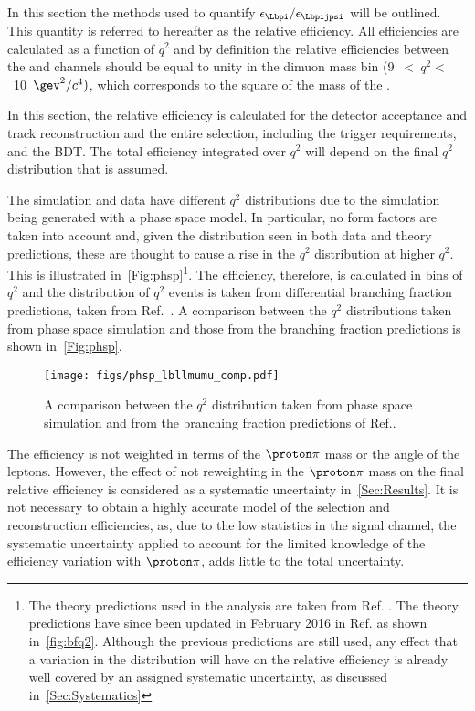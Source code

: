 In this section the methods used to quantify $\epsilon_{\Lbpi}/\epsilon_{\Lbpijpsi}$ will be outlined. This quantity is referred to hereafter as the relative efficiency. All efficiencies are calculated as a function of $q^{2}$ and by definition the relative efficiencies between the \Lbpi and \Lbpijpsi channels should be equal to unity in the dimuon mass bin (9~$<~q^{2}<$~10~$\gev^{2}/c^{4})$, which corresponds to the square of the  mass of the \jpsi.

In this section, the relative efficiency is calculated for the detector acceptance and track reconstruction and the entire selection, including the trigger requirements, and the BDT. The total efficiency integrated over $q^{2}$ will depend on the final $q^{2}$ distribution that is assumed. 


The simulation and data have different $q^{2}$ distributions due to the simulation being generated with a phase space model. In particular, no form factors are taken into account and, given the distribution seen in both \LbL data and theory predictions, these are thought to cause a rise in the $q^{2}$ distribution at higher $q^{2}$. This is illustrated in~\autoref{Fig:phsp}\footnote{The \LbL theory predictions used in the analysis are taken from Ref. \cite{Meinel}. The theory predictions have since been updated in February 2016 in Ref.\cite{Detmold:2016pkz} as shown in~\autoref{fig:bfq2}. Although the previous predictions are still used, any effect that a variation in the \qsq distribution will have on the relative efficiency is already well covered by an assigned systematic uncertainty, as discussed in~\autoref{Sec:Systematics}}. The efficiency, therefore, is calculated in bins of $q^{2}$ and the distribution of $q^{2}$ events is taken from \LbL differential branching fraction predictions, taken from Ref.~\cite{Meinel}. A comparison between the $q^{2}$ distributions taken from phase space simulation and those from the \LbL branching fraction predictions is shown in~\autoref{Fig:phsp}.

\begin{figure}[h!]
  \def\nh{0.7\textwidth}
  \centering
  \texttt{[image: figs/phsp\_lbllmumu\_comp.pdf]}
  \caption{A comparison between the $q^{2}$ distribution taken from phase space simulation and from the \LbL branching fraction predictions of Ref.\cite{Meinel}.}
  \label{Fig:phsp}
\end{figure}
%

The efficiency is not weighted in terms of the $\proton \pi$ mass or the angle of the leptons. However, the effect of not reweighting in the $\proton \pi$ mass on the final relative efficiency is considered as a systematic uncertainty in~\autoref{Sec:Results}. It is not necessary to obtain a highly accurate model of the selection and reconstruction efficiencies, as, due to the low statistics in the signal channel, the systematic uncertainty applied to account for the limited knowledge of the efficiency variation with $\proton \pi$,  adds little to the total uncertainty. %

